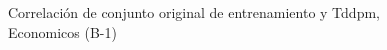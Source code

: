 \begin{figure}[H]
    \centering
    
    \caption{Correlación de conjunto original de entrenamiento y Tddpm, Economicos (B-1)}
    \label{pairwise-economicos-b-1-tddpm_mlp}
\end{figure}